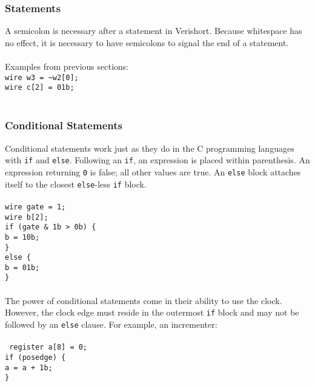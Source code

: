 \documentclass[letterpaper,11pt]{article}
\newcommand{\tab}{\hspace*{2em}}
\begin{document}
        \subsubsection{Statements}
        A semicolon is necessary after a statement in Verishort.  Because whitespace has no effect, it is 
        necessary to have semicolons to signal the end of a statement.\\\\
        Examples from previous sections:\\
        \texttt{wire w3 = \textasciitilde w2[0];}\\
        \texttt{wire c[2] = 01b;} \\\\
        
        \subsubsection{Conditional Statements}
        Conditional statements work just as they do in the C programming languages with \texttt{if} and \texttt{else}. 
        Following an \texttt{if}, an expression is placed within parenthesis.  An expression returning \texttt{0} is false; all other values are true.  An \texttt{else} 
        block attaches itself to the closest \texttt{else}-less \texttt{if} block.\\\\
        \texttt{wire gate = 1; \\
        wire b[2]; \\
        if (gate \& 1b > 0b) \{ \\
        \tab b = 10b; \\
        \} \\
        else \{ \\
        \tab b = 01b; \\
        \}}\\\\
        The power of conditional statements come in their ability to use the clock.  However, the clock edge must reside in the outermost \texttt{if} block and may not be followed by an \texttt{else} clause. For example, an incrementer:\\\\
        \texttt{
        register a[8] = 0; \\
        if (posedge) \{ \\
        \tab a = a + 1b;\\
        \}}\\
\end{document}
